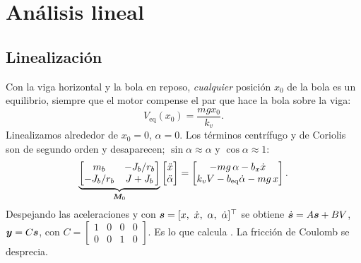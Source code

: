 \chapter{Análisis lineal}
\label{cap:analisis}

\section{Linealización}

Con la viga horizontal y la bola en reposo, \emph{cualquier} posición $x_0$ de la bola es un equilibrio, siempre que el motor compense el par que hace la bola sobre la viga:
\begin{equation}
  V_{\text{eq}}(x_0) = \frac{m g x_0}{k_v} .
  \label{eq:veq}
\end{equation}
Linealizamos alrededor de $x_0=0$, $\alpha=0$. Los términos centrífugo y de Coriolis son de segundo orden y desaparecen; $\sin\alpha\approx\alpha$ y $\cos\alpha\approx1$:
\begin{equation}
  \underbrace{\begin{bmatrix} m_b & -J_b/r_b\\ -J_b/r_b & J+J_b\end{bmatrix}}_{\bm{M}_0}
  \begin{bmatrix}\ddot{x}\\ \ddot{\alpha}\end{bmatrix}
  =
  \begin{bmatrix} -m g\,\alpha - b_x\dot{x}\\ k_vV - b_{\text{eq}}\dot{\alpha} - m g\,x\end{bmatrix}.
  \label{eq:lin}
\end{equation}
Despejando las aceleraciones y con $\bm{s}=[x,\ \dot{x},\ \alpha,\ \dot{\alpha}]^\top$ se obtiene $\dot{\bm{s}}=A\bm{s}+BV$, $\bm{y}=C\bm{s}$, con $C=\left[\begin{smallmatrix}1&0&0&0\\0&0&1&0\end{smallmatrix}\right]$. Es lo que calcula . La fricción de Coulomb se desprecia.

